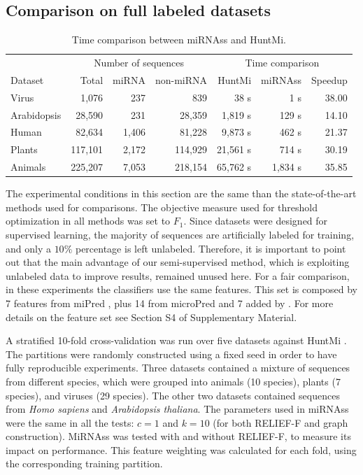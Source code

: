\documentclass{article}
\begin{document}
\subsection{Comparison on full labeled datasets}
\begin{table}[tpb]
	\centering
	\caption{Time comparison between miRNAss and HuntMi.\label{tab:times}}
	\begin{tabular}{@{}lrrrrrr@{}} \toprule
		&  \multicolumn{3}{c}{Number of sequences} & \multicolumn{3}{c}{Time comparison} \\
		Dataset     &   Total  &   miRNA   &  non-miRNA  &  HuntMi  & miRNAss & Speedup  \\\midrule
		Virus       &   1,076  &      237  &       839   &     38 s &     1 s & 38.00    \\
		Arabidopsis &  28,590  &      231  &    28,359   &  1,819 s &   129 s & 14.10    \\
		Human       &  82,634  &    1,406  &    81,228   &  9,873 s &   462 s & 21.37    \\
		Plants      & 117,101  &    2,172  &   114,929   & 21,561 s &   714 s & 30.19    \\
		Animals     & 225,207  &    7,053  &   218,154   & 65,762 s & 1,834 s & 35.85    \\\bottomrule
	\end{tabular}
\end{table}
The experimental conditions in this section are the same than the state-of-the-art methods used for comparisons. The objective measure used for threshold optimization in all methods was set to $F_{1}$. Since datasets were designed for supervised learning, the majority of sequences are artificially labeled for training, and only a $10 \%$ percentage is left unlabeled. Therefore, it is important to point out that the main advantage of our semi-supervised method, which is exploiting unlabeled data to improve results, remained unused here. 
For a fair comparison, in these experiments the classifiers use the same features. This set is composed by 7 features from miPred \citep{ng2007novo}, plus 14 from microPred \citep{batuwita2009micropred} and 7 added by \cite{gudys2013huntmi}. For more details on the feature set see Section S4 of Supplementary Material.

A stratified 10-fold cross-validation was run over five datasets against HuntMi \citep{gudys2013huntmi}. The partitions were randomly constructed using a fixed seed in order to have fully reproducible experiments. Three datasets contained a mixture of sequences from different species, which were grouped into animals (10 species), plants (7 species), and viruses (29 species). The other two datasets contained sequences from \textit{Homo sapiens} and \textit{Arabidopsis thaliana}. The parameters used in miRNAss were the same in all the tests: $c=1$ and $k=10$ (for both RELIEF-F and graph construction). MiRNAss was tested with and without RELIEF-F, to measure its impact on  performance. This feature weighting was calculated for each fold, using the corresponding training partition.
\end{document}
